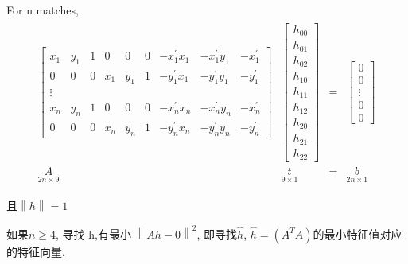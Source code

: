 For n matches,
\begin{align*}
    \begin{array}{cccc}
        \begin{bmatrix}
            x_{1} & y_{1} & 1 & 0 & 0 & 0 & -x_{1}^{\prime} x_{1} & -x_{1}^{\prime} y_{1} & -x_{1}^{\prime} \\
            0 & 0 & 0 & x_{1} & y_{1} & 1 & -y_{1}^{\prime} x_{1} & -y_{1}^{\prime} y_{1} & -y_{1}^{\prime} \\
            \vdots\\
            x_{n} & y_{n} & 1 & 0 & 0 & 0 & -x_{n}^{\prime} x_{n} & -x_{n}^{\prime} y_{n} & -x_{n}^{\prime} \\
            0 & 0 & 0 & x_{n} & y_{n} & 1 & -y_{n}^{\prime} x_{n} & -y_{n}^{\prime} y_{n} & -y_{n}^{\prime}
        \end{bmatrix}&\begin{bmatrix}
            h_{00} \\
            h_{01} \\
            h_{02} \\
            h_{10} \\
            h_{11} \\
            h_{12} \\
            h_{20} \\
            h_{21} \\
            h_{22}
        \end{bmatrix}&=&\begin{bmatrix}
            0\\0\\
            \vdots\\
            0\\0
        \end{bmatrix}\\
        \underset{2n\times 9}{A} & \underset{9\times 1}{t}&=&\underset{2n\times 1}{b}
    \end{array}
\end{align*}

且$\left\| h \right\|=1$

如果$n\ge4$, 寻找 h,有最小 $\left\| Ah-0 \right\|^2$, 即寻找$\hat{h}$, $\hat{h}=(A^TA)$的最小特征值对应的特征向量. 


